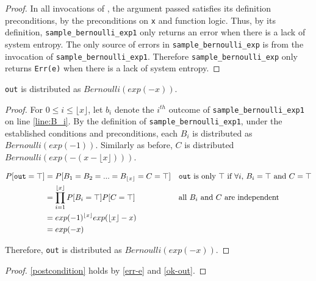 \documentclass{article}
\begin{document}
\begin{proof} 
    In all invocations of , the argument passed satisfies its definition preconditions,  
    by the preconditions on \texttt{x} and function logic. 
    Thus, by its definition, \texttt{sample\_bernoulli\_exp1} only returns an error when there is a lack of system entropy. 
    The only source of errors in \texttt{sample\_bernoulli\_exp} is from the invocation of \texttt{sample\_bernoulli\_exp1}. 
    Therefore \texttt{sample\_bernoulli\_exp} only returns \texttt{Err(e)} when there is a lack of system entropy. 
\end{proof} 
 
\begin{lemma} 
    \label{ok-out} 
    \texttt{out} is distributed as $Bernoulli(exp(-x))$. 
\end{lemma} 
 
\begin{proof} 
    For $0 \le i \le \lfloor x \rfloor$, let $b_i$ denote the $i^{th}$ outcome of \texttt{sample\_bernoulli\_exp1} on line \ref{line:B_i}. 
    By the definition of \texttt{sample\_bernoulli\_exp1}, under the established conditions and preconditions, 
    each $B_i$ is distributed as $Bernoulli(exp(-1))$. 
    Similarly as before, $C$ is distributed $Bernoulli(exp(-(x - \lfloor x \rfloor)))$. 
 
    \begin{align*} 
        P[\texttt{out} = \top] &= P[B_1 = B_2 = ... = B_{\lfloor x \rfloor} = C = \top] && \text{\texttt{out} is only $\top$ if $\forall i$, $B_i = \top$ and $C = \top$} \\ 
        &= \prod_{i=1}^{\lfloor x \rfloor} P[B_i = \top] P[C = \top] && \text{all $B_i$ and $C$ are independent} \\ 
        &= exp(-1)^{\lfloor x \rfloor} exp(\lfloor x \rfloor - x) \\ 
        &= exp(-x) 
    \end{align*} 
 
    Therefore, \texttt{out} is distributed as $Bernoulli(exp(-x))$. 
\end{proof} 
 
 
\begin{proof} 
    \ref{postcondition} holds by \ref{err-e} and \ref{ok-out}. 
\end{proof} 
 
 
 
 
\end{document}

